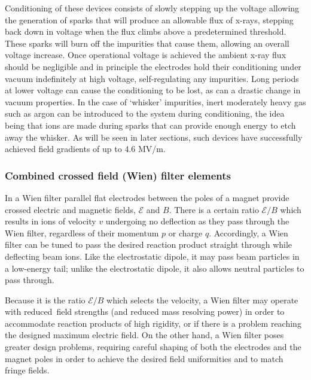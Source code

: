 Conditioning of these devices consists of slowly stepping up the voltage allowing the generation of sparks that will produce an allowable flux of x-rays, stepping back down in voltage when the flux climbs above a predetermined threshold. These sparks will burn off the impurities that cause them, allowing an overall voltage increase. Once operational voltage is achieved the ambient x-ray flux should be negligible and in principle the electrodes hold their conditioning under vacuum indefinitely at high voltage, self-regulating any impurities. Long periods at lower voltage can cause the conditioning to be lost, as can a drastic change in vacuum properties. In the case of `whisker' impurities, inert moderately heavy gas such as argon can be introduced to the system during conditioning, the idea being that ions are made during sparks that can provide enough energy to etch away the whisker. As will be seen in later sections, such devices have successfully achieved field gradients of up to 4.6 MV/m.  

\subsubsection{Combined crossed field (Wien) filter elements}


In a Wien filter parallel flat electrodes between the poles of a magnet provide crossed electric and magnetic fields, $\mathcal{E}$ and $B$.      There is a certain ratio $\mathcal{E}/B$ which results in ions of velocity $v$  undergoing no deflection as they pass through the Wien filter, regardless of their momentum $p$ or charge $q$.    Accordingly, a Wien filter can be tuned to pass the desired reaction product straight through while deflecting beam ions.  Like the electrostatic dipole, it may pass beam particles in  a low-energy tail; unlike the electrostatic dipole, it  also allows   neutral particles to pass through.

Because it is  the ratio $\mathcal{E}/B$ which selects the velocity, a Wien filter may operate with reduced\ field strengths (and reduced mass resolving power)  in order to accommodate reaction products of high rigidity, or if there is a problem reaching the designed maximum electric field.    On the other hand, a Wien filter poses greater design problems, requiring careful shaping of both the electrodes and the magnet poles in order to achieve the desired field uniformities and to match fringe fields. 

